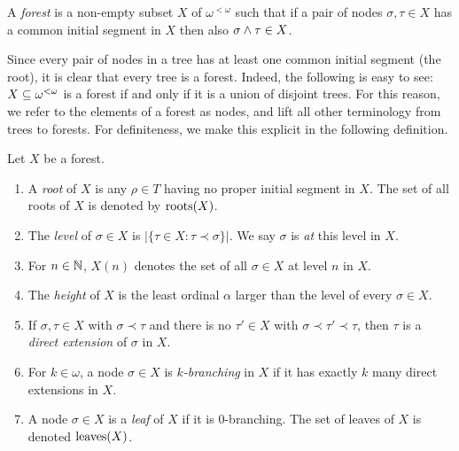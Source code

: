 \begin{definition}\label{def:forest}
	A \emph{forest} is a non-empty subset $X$ of $\omega^{<\omega}$ such that if a pair of nodes $\sigma,\tau \in X$ has a common initial segment in $X$ then also $\sigma \wedge \tau \in X$.
\end{definition}

Since every pair of nodes in a tree has at least one common initial segment (the root), it is clear that every tree is a forest. Indeed, the following is easy to see: $X \subseteq {\omega^{<\omega}}$ is a forest if and only if it is a union of disjoint trees. For this reason, we refer to the elements of a forest as nodes, and lift all other terminology from trees to forests. For definiteness, we make this explicit in the following definition.

\begin{definition}
	Let $X$ be a forest.
	\begin{enumerate}
		\item A \emph{root} of $X$ is any $\rho \in T$ having no proper initial segment in $X$. The set of all roots of $X$ is denoted by $\operatorname{roots}(X)$.
		\item The \emph{level} of $\sigma \in X$ is $|\{ \tau \in X: \tau \prec \sigma\}|$. We say $\sigma$ is \emph{at} this level in $X$.
		\item For $n \in \mathbb{N}$, $X(n)$ denotes the set of all $\sigma \in X$ at level $n$ in $X$.
		\item The \emph{height} of $X$ is the least ordinal $\alpha$ larger than the level of every $\sigma \in X$.
		\item If $\sigma,\tau \in X$ with $\sigma \prec \tau$ and there is no $\tau' \in X$ with $\sigma \prec \tau' \prec \tau$, then $\tau$ is a \emph{direct extension} of $\sigma$ in $X$.
		\item For $k \in \omega$, a node $\sigma \in X$ is \emph{$k$-branching} in $X$ if it has exactly $k$ many direct extensions in $X$.
		\item A node $\sigma \in X$ is a \emph{leaf} of $X$ if it is $0$-branching. The set of leaves of $X$ is denoted $\operatorname{leaves}(X)$.
	\end{enumerate}
\end{definition}

